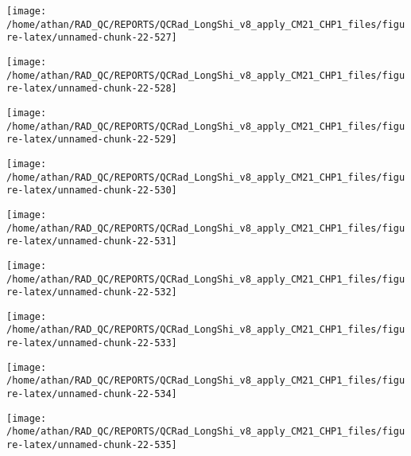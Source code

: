 \documentclass[
  10pt,
  a4paper,oneside]{article}
\begin{document}
\begin{center}\texttt{[image: /home/athan/RAD\_QC/REPORTS/QCRad\_LongShi\_v8\_apply\_CM21\_CHP1\_files/figure-latex/unnamed-chunk-22-527]} \end{center}

\begin{center}\texttt{[image: /home/athan/RAD\_QC/REPORTS/QCRad\_LongShi\_v8\_apply\_CM21\_CHP1\_files/figure-latex/unnamed-chunk-22-528]} \end{center}

\begin{center}\texttt{[image: /home/athan/RAD\_QC/REPORTS/QCRad\_LongShi\_v8\_apply\_CM21\_CHP1\_files/figure-latex/unnamed-chunk-22-529]} \end{center}

\begin{center}\texttt{[image: /home/athan/RAD\_QC/REPORTS/QCRad\_LongShi\_v8\_apply\_CM21\_CHP1\_files/figure-latex/unnamed-chunk-22-530]} \end{center}

\begin{center}\texttt{[image: /home/athan/RAD\_QC/REPORTS/QCRad\_LongShi\_v8\_apply\_CM21\_CHP1\_files/figure-latex/unnamed-chunk-22-531]} \end{center}

\begin{center}\texttt{[image: /home/athan/RAD\_QC/REPORTS/QCRad\_LongShi\_v8\_apply\_CM21\_CHP1\_files/figure-latex/unnamed-chunk-22-532]} \end{center}

\begin{center}\texttt{[image: /home/athan/RAD\_QC/REPORTS/QCRad\_LongShi\_v8\_apply\_CM21\_CHP1\_files/figure-latex/unnamed-chunk-22-533]} \end{center}

\begin{center}\texttt{[image: /home/athan/RAD\_QC/REPORTS/QCRad\_LongShi\_v8\_apply\_CM21\_CHP1\_files/figure-latex/unnamed-chunk-22-534]} \end{center}

\begin{center}\texttt{[image: /home/athan/RAD\_QC/REPORTS/QCRad\_LongShi\_v8\_apply\_CM21\_CHP1\_files/figure-latex/unnamed-chunk-22-535]} \end{center}
\end{document}
